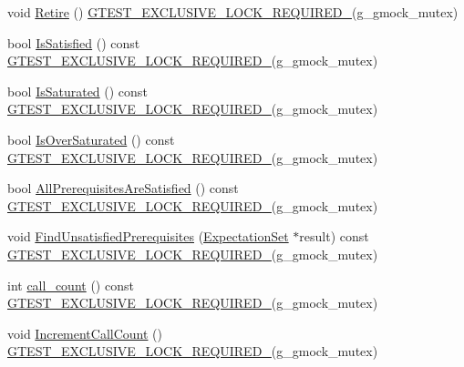 \begin{DoxyCompactItemize}
void \hyperlink{classtesting_1_1internal_1_1ExpectationBase_a0aeeb4c1e66c2f2aa0853c267ad3e781}{Retire} () \hyperlink{gtest-port_8h_a149f693bd59fa1bc937af54c0cdcb32f}{G\+T\+E\+S\+T\+\_\+\+E\+X\+C\+L\+U\+S\+I\+V\+E\+\_\+\+L\+O\+C\+K\+\_\+\+R\+E\+Q\+U\+I\+R\+E\+D\+\_\+}(g\+\_\+gmock\+\_\+mutex)
\item 
bool \hyperlink{classtesting_1_1internal_1_1ExpectationBase_ae629adc2dd9aee0ac62e50314f1a6449}{Is\+Satisfied} () const \hyperlink{gtest-port_8h_a149f693bd59fa1bc937af54c0cdcb32f}{G\+T\+E\+S\+T\+\_\+\+E\+X\+C\+L\+U\+S\+I\+V\+E\+\_\+\+L\+O\+C\+K\+\_\+\+R\+E\+Q\+U\+I\+R\+E\+D\+\_\+}(g\+\_\+gmock\+\_\+mutex)
\item 
bool \hyperlink{classtesting_1_1internal_1_1ExpectationBase_ad3e4340cedefdc24fce1478a8d6cab93}{Is\+Saturated} () const \hyperlink{gtest-port_8h_a149f693bd59fa1bc937af54c0cdcb32f}{G\+T\+E\+S\+T\+\_\+\+E\+X\+C\+L\+U\+S\+I\+V\+E\+\_\+\+L\+O\+C\+K\+\_\+\+R\+E\+Q\+U\+I\+R\+E\+D\+\_\+}(g\+\_\+gmock\+\_\+mutex)
\item 
bool \hyperlink{classtesting_1_1internal_1_1ExpectationBase_a080dab35ecc6c57096f50758a0e8123d}{Is\+Over\+Saturated} () const \hyperlink{gtest-port_8h_a149f693bd59fa1bc937af54c0cdcb32f}{G\+T\+E\+S\+T\+\_\+\+E\+X\+C\+L\+U\+S\+I\+V\+E\+\_\+\+L\+O\+C\+K\+\_\+\+R\+E\+Q\+U\+I\+R\+E\+D\+\_\+}(g\+\_\+gmock\+\_\+mutex)
\item 
bool \hyperlink{classtesting_1_1internal_1_1ExpectationBase_a82ba68cdd71a8b5aff5a5be24c23a637}{All\+Prerequisites\+Are\+Satisfied} () const \hyperlink{gtest-port_8h_a149f693bd59fa1bc937af54c0cdcb32f}{G\+T\+E\+S\+T\+\_\+\+E\+X\+C\+L\+U\+S\+I\+V\+E\+\_\+\+L\+O\+C\+K\+\_\+\+R\+E\+Q\+U\+I\+R\+E\+D\+\_\+}(g\+\_\+gmock\+\_\+mutex)
\item 
void \hyperlink{classtesting_1_1internal_1_1ExpectationBase_a9eb518c079f950a59c67e8012d3371c0}{Find\+Unsatisfied\+Prerequisites} (\hyperlink{classtesting_1_1ExpectationSet}{Expectation\+Set} $\ast$result) const \hyperlink{gtest-port_8h_a149f693bd59fa1bc937af54c0cdcb32f}{G\+T\+E\+S\+T\+\_\+\+E\+X\+C\+L\+U\+S\+I\+V\+E\+\_\+\+L\+O\+C\+K\+\_\+\+R\+E\+Q\+U\+I\+R\+E\+D\+\_\+}(g\+\_\+gmock\+\_\+mutex)
\item 
int \hyperlink{classtesting_1_1internal_1_1ExpectationBase_aacc0399271907194ac1627439f65047a}{call\+\_\+count} () const \hyperlink{gtest-port_8h_a149f693bd59fa1bc937af54c0cdcb32f}{G\+T\+E\+S\+T\+\_\+\+E\+X\+C\+L\+U\+S\+I\+V\+E\+\_\+\+L\+O\+C\+K\+\_\+\+R\+E\+Q\+U\+I\+R\+E\+D\+\_\+}(g\+\_\+gmock\+\_\+mutex)
\item 
void \hyperlink{classtesting_1_1internal_1_1ExpectationBase_aef1766c39ad6478f9041e0f5c5000532}{Increment\+Call\+Count} () \hyperlink{gtest-port_8h_a149f693bd59fa1bc937af54c0cdcb32f}{G\+T\+E\+S\+T\+\_\+\+E\+X\+C\+L\+U\+S\+I\+V\+E\+\_\+\+L\+O\+C\+K\+\_\+\+R\+E\+Q\+U\+I\+R\+E\+D\+\_\+}(g\+\_\+gmock\+\_\+mutex)

\end{DoxyCompactItemize}
